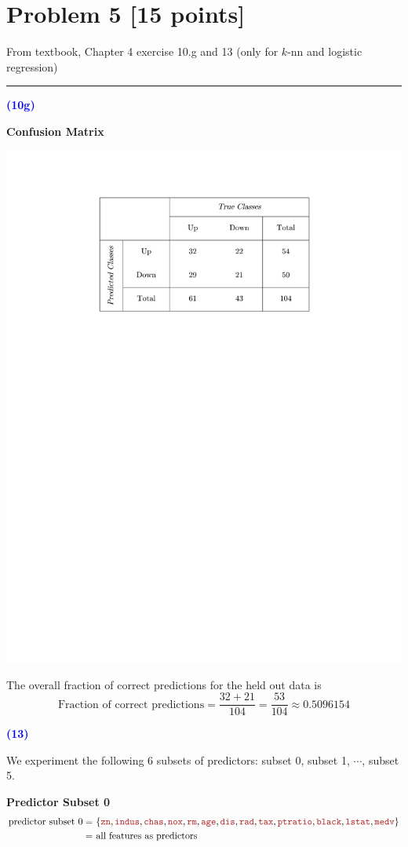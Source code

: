 \documentclass{article}
\newcommand{\qnum}[1]{\noindent\textcolor{blue}{\textbf{(#1)}}}
\newcommand{\sep}{\begin{center}\textcolor{gray}{\rule{\textwidth}{0.75pt}}\end{center}}
\begin{document}
%
\newpage
\section*{Problem 5 [15 points]} 

From textbook, Chapter 4 exercise  10.g and 13 (only for $k$-nn and logistic regression)
\sep 
\qnum{10g}

\begin{center}
    \textbf{Confusion Matrix}
    \bigskip
    
    \includegraphics[trim={5cm 19cm 5cm 2.5cm},clip,width=0.55\linewidth]{Images/Prob5/Prob5-10-ConfMat.pdf}
\end{center}

The overall fraction of correct predictions for the held out data is 
\[
    \text{Fraction of correct predictions}
    = \frac{32 + 21}{104}
    = \frac{53}{104}
    \approx 0.5096154
\]
\bigskip\bigskip


\qnum{13}\medskip
\newcommand{\feat}[1]{\textcolor{myfirebrick}{\texttt{#1}}}

We experiment the following 6 subsets of predictors: subset 0, subset 1, $\cdots$, subset 5.
\bigskip


\noindent\textbf{Predictor Subset 0}
\[
    \begin{aligned}
    \text{predictor subset 0} =&\ 
    \{ 
    \feat{zn}, \feat{indus}, \feat{chas}, \feat{nox}, \feat{rm}, \feat{age}, \feat{dis},
              \feat{rad}, \feat{tax}, \feat{ptratio}, \feat{black}, \feat{lstat}, \feat{medv}
    \}\\
    =&\ \text{all features as predictors}
    \end{aligned}
\]
\end{document}
